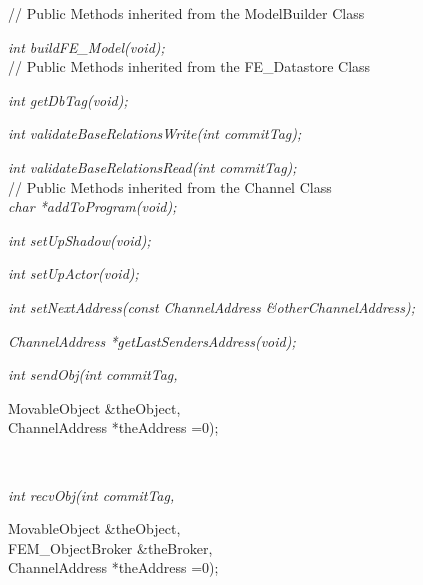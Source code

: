 // Public Methods  inherited from the ModelBuilder Class 

{\em int buildFE\_Model(void);}\\ 

// Public Methods  inherited from the FE\_Datastore Class 

{\em int getDbTag(void);}

{\em int validateBaseRelationsWrite(int commitTag); }

{\em int validateBaseRelationsRead(int commitTag); }\\ 

\indent// Public Methods  inherited from the Channel Class \\
{\em char *addToProgram(void); }

{\em int setUpShadow(void);}

{\em int setUpActor(void);}

{\em int setNextAddress(const ChannelAddress \&otherChannelAddress);}

{\em ChannelAddress *getLastSendersAddress(void);}

{\em int sendObj(int commitTag, 

\indent\indent\indent\indent\indent		MovableObject \&theObject, \\
\indent\indent\indent\indent\indent		ChannelAddress *theAddress =0);}\\
{\em int recvObj(int commitTag, 

\indent\indent\indent\indent\indent		MovableObject \&theObject, \\
\indent\indent\indent\indent\indent		FEM\_ObjectBroker \&theBroker, \\
\indent\indent\indent\indent\indent		ChannelAddress *theAddress =0);}\\
		
